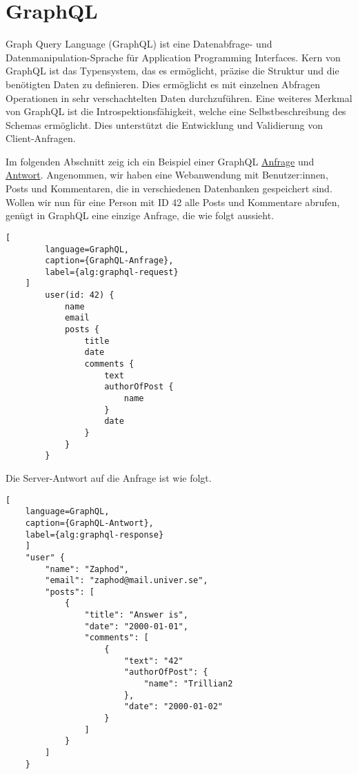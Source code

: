 \documentclass[draft,final]{vutinfth} %
\begin{document}
\section{GraphQL}

Graph Query Language (GraphQL) ist eine Datenabfrage- und Datenmanipulation-Sprache für Application Programming Interfaces. 
Kern von GraphQL ist das Typensystem, das es ermöglicht, präzise die Struktur und die benötigten Daten zu definieren. Dies ermöglicht es mit einzelnen Abfragen Operationen in sehr verschachtelten Daten durchzuführen.
Eine weiteres Merkmal von GraphQL ist die Introspektionsfähigkeit, welche eine Selbstbeschreibung des Schemas ermöglicht.
Dies unterstützt die Entwicklung und Validierung von Client-Anfragen.

Im folgenden Abschnitt zeig ich ein Beispiel einer GraphQL \hyperref[alg:graphql-request]{Anfrage} und \hyperref[alg:graphql-response]{Antwort}.
Angenommen, wir haben eine Webanwendung mit Benutzer:innen, Posts und Kommentaren, die in verschiedenen Datenbanken gespeichert sind.
Wollen wir nun für eine Person mit ID 42 alle Posts und Kommentare abrufen, genügt in GraphQL eine einzige Anfrage, die wie folgt aussieht.

\renewcommand{\lstlistingname}{Query}
\begin{lstlisting}[
		language=GraphQL, 
		caption={GraphQL-Anfrage}, 
		label={alg:graphql-request}
	]
		user(id: 42) {
			name
			email
			posts {
				title
				date
				comments {
					text
					authorOfPost {
						name
					}
					date
				}
			}
		}
\end{lstlisting}

Die Server-Antwort auf die Anfrage ist wie folgt.

\begin{lstlisting}[
	language=GraphQL, 
	caption={GraphQL-Antwort}, 
	label={alg:graphql-response}
	]
	"user" {
		"name": "Zaphod",
		"email": "zaphod@mail.univer.se",
		"posts": [
			{
				"title": "Answer is",
				"date": "2000-01-01",
				"comments": [
					{
						"text": "42"
						"authorOfPost": {
							"name": "Trillian2
						},
						"date": "2000-01-02"
					}
				]
			}
		]
	}
\end{lstlisting}





\end{document}

